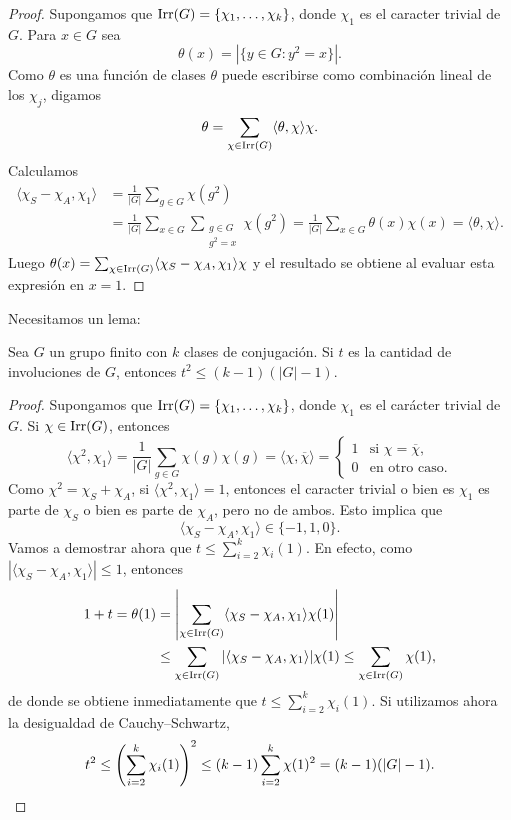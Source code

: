 \begin{proof}
Supongamos que $\operatorname{Irr}(G)=\{\chi_1,\dots,\chi_k\}$, donde $\chi_1$ es el caracter trivial de $G$. 
Para $x\in G$ sea 
\[
\theta(x)=|\{y\in G:y^2=x\}|.
\]
Como $\theta$ es una función de clases
$\theta$ puede escribirse como combinación lineal de los $\chi_j$, digamos
\[
\theta=\sum_{\chi\in\operatorname{Irr}(G)}\langle\theta,\chi\rangle\chi.
\]
Calculamos
\begin{align*}
    \langle\chi_S-\chi_A,\chi_1\rangle 
    &=\frac{1}{|G|}\sum_{g\in G}\chi(g^2)\\
    &=\frac{1}{|G|}\sum_{x\in G}\sum_{\substack{g\in G\\g^2=x}}\chi(g^2)
    =\frac{1}{|G|}\sum_{x\in G}\theta(x)\chi(x)=\langle\theta,\chi\rangle.
\end{align*}
Luego $\theta(x)=\sum_{\chi\in\operatorname{Irr}(G)}\langle\chi_S-\chi_A,\chi_1\rangle\chi$ y el resultado se obtiene
al evaluar esta expresión en $x=1$. 
\end{proof}

Necesitamos un lema:

\begin{lemma}
Sea $G$ un grupo finito con $k$ clases de conjugación. 
Si $t$ es la cantidad de involuciones de $G$, entonces 
$t^2\leq (k-1)(|G|-1)$. 
\end{lemma}

\begin{proof}
Supongamos que $\operatorname{Irr}(G)=\{\chi_1,\dots,\chi_k\}$, donde $\chi_1$ es el 
carácter trivial de $G$. 
Si $\chi\in\operatorname{Irr}(G)$, entonces
\[
\langle\chi^2,\chi_1\rangle=\frac{1}{|G|}\sum_{g\in G}\chi(g)\chi(g)=\langle\chi,\overline{\chi}\rangle=\begin{cases}
1 & \text{si $\chi=\overline{\chi}$},\\
0 & \text{en otro caso}.
\end{cases}
\]
Como $\chi^2=\chi_S+\chi_A$, si $\langle\chi^2,\chi_1\rangle=1$, entonces el caracter trivial 
o bien es $\chi_1$ es parte de $\chi_S$ o bien es parte de $\chi_A$, pero no de ambos. Esto implica que
\[
\langle\chi_S-\chi_A,\chi_1\rangle\in\{-1,1,0\}.
\]
Vamos a demostrar ahora que 
$t\leq\sum_{i=2}^k\chi_i(1)$. En efecto, 
como $|\langle\chi_S-\chi_A,\chi_1\rangle|\leq 1$, 
entonces 
\begin{align*}
1+t=\theta(1)
&=\left|\sum_{\chi\in\operatorname{Irr}(G)}\langle\chi_S-\chi_A,\chi_1\rangle\chi(1)\right|\\
&\leq\sum_{\chi\in\operatorname{Irr}(G)}|\langle\chi_S-\chi_A,\chi_1\rangle|\chi(1)
\leq\sum_{\chi\in\operatorname{Irr}(G)}\chi(1),
\end{align*}
de donde se obtiene inmediatamente que $t\leq\sum_{i=2}^k\chi_i(1)$. 
Si utilizamos ahora 
la desigualdad de Cauchy--Schwartz, 
\[
t^2\leq\left(\sum_{i=2}^k\chi_i(1)\right)^2
\leq(k-1)\sum_{i=2}^k\chi(1)^2=(k-1)(|G|-1).\qedhere
\]
\end{proof}

